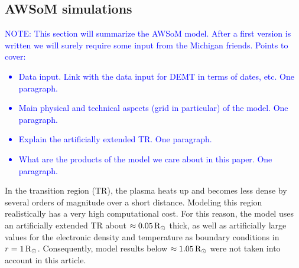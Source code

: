 \documentclass[namedreferences]{solarphysics}
\newcommand{\mrsun}{{\rm R_\odot}}
\def\temp#1{\textcolor{gray}{#1}}
\def\notebyalbert#1{\textcolor{blue}{NOTE: #1}}
\begin{document}
\begin{article}


\subsection{AWSoM simulations}\label{awsom} 

\noindent\notebyalbert{This section will summarize the AWSoM model. After a first version is written we will surely require some input from the Michigan friends. Points to cover:
\begin{itemize}
  \item Data input. Link with the data input for DEMT in terms of dates, etc. One paragraph.
  \item Main physical and technical aspects (grid in particular) of the model.  One paragraph. 
  \item Explain the artificially extended TR. One paragraph.
  \item What are the products of the model we care about in this paper. One paragraph.
\end{itemize}
}

In the transition region {(TR)}, the plasma heats up and becomes less dense {by} several orders of magnitude {over} a short distance. Modeling this region {realistically has a very high computational cost}. For this {reason,} the model uses {an artificially} extended {TR about $\approx 0.05\,\mrsun$ thick, as well as artificially large values for the electronic density and temperature as boundary conditions in $r=1\,\mrsun$.} Consequently, model results below {$\approx 1.05\,\mrsun$} were not taken into account in this article.


\end{article}
\end{document}

